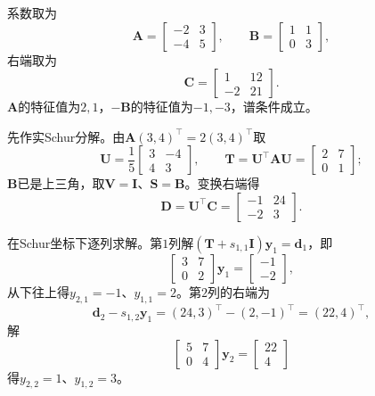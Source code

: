 \begin{example}
\label{ex:ls-bartels-stewart-2x2}
系数取为
\[
 \bm A=\begin{bmatrix}-2&3\\-4&5\end{bmatrix},\qquad
 \bm B=\begin{bmatrix}1&1\\0&3\end{bmatrix},
\]
右端取为
\[
 \bm C=\begin{bmatrix}1&12\\-2&21\end{bmatrix}.
\]
$\bm A$的特征值为$2,1$，$-\bm B$的特征值为$-1,-3$，谱条件成立。

先作实Schur分解。由$\bm A(3,4)^\top=2(3,4)^\top$取
\[
 \bm U=\frac15\begin{bmatrix}3&-4\\4&3\end{bmatrix},\qquad
 \bm T=\bm U^\top\bm A\bm U=\begin{bmatrix}2&7\\0&1\end{bmatrix};
\]
$\bm B$已是上三角，取$\bm V=\bm I$、$\bm S=\bm B$。变换右端得
\[
 \bm D=\bm U^\top\bm C=\begin{bmatrix}-1&24\\-2&3\end{bmatrix}.
\]

在Schur坐标下逐列求解。第$1$列解$(\bm T+s_{1,1}\bm I)\bm y_1=\bm d_1$，即
\[
 \begin{bmatrix}3&7\\0&2\end{bmatrix}\bm y_1=\begin{bmatrix}-1\\-2\end{bmatrix},
\]
从下往上得$y_{2,1}=-1$、$y_{1,1}=2$。第$2$列的右端为
\[
 \bm d_2-s_{1,2}\bm y_1=(24,3)^\top-(2,-1)^\top=(22,4)^\top ,
\]
解
\[
 \begin{bmatrix}5&7\\0&4\end{bmatrix}\bm y_2=\begin{bmatrix}22\\4\end{bmatrix}
\]
得$y_{2,2}=1$、$y_{1,2}=3$。


\end{example}
